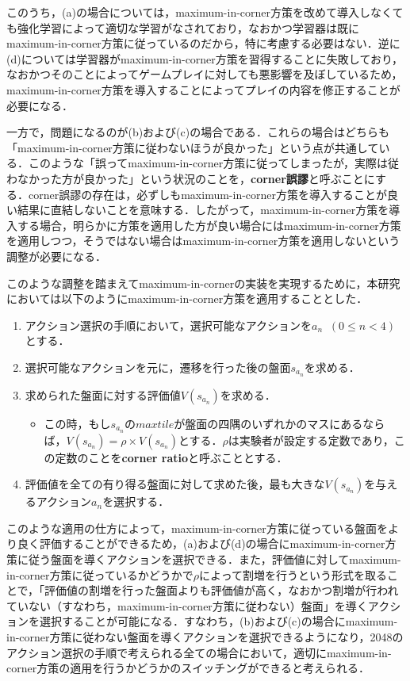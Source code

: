 \documentclass{suribt}
\begin{document}
このうち，(a)の場合については，maximum-in-corner方策を改めて導入しなくても強化学習によって適切な学習がなされており，なおかつ学習器は既にmaximum-in-corner方策に従っているのだから，特に考慮する必要はない．逆に(d)については学習器がmaximum-in-corner方策を習得することに失敗しており，なおかつそのことによってゲームプレイに対しても悪影響を及ぼしているため，maximum-in-corner方策を導入することによってプレイの内容を修正することが必要になる．

一方で，問題になるのが(b)および(c)の場合である．これらの場合はどちらも「maximum-in-corner方策に従わないほうが良かった」という点が共通している．このような「誤ってmaximum-in-corner方策に従ってしまったが，実際は従わなかった方が良かった」という状況のことを，\textbf{corner誤謬}と呼ぶことにする．corner誤謬の存在は，必ずしもmaximum-in-corner方策を導入することが良い結果に直結しないことを意味する．したがって，maximum-in-corner方策を導入する場合，明らかに方策を適用した方が良い場合にはmaximum-in-corner方策を適用しつつ，そうではない場合はmaximum-in-corner方策を適用しないという調整が必要になる．

このような調整を踏まえてmaximum-in-cornerの実装を実現するために，本研究においては以下のようにmaximum-in-corner方策を適用することとした．

\begin{enumerate}
\item アクション選択の手順において，選択可能なアクションを$a_n \;\; (0 \leq n < 4)$とする．
\item 選択可能なアクションを元に，遷移を行った後の盤面$s_{a_n}$を求める．
\item 求められた盤面に対する評価値$V(s_{a_n})$を求める．
\begin{itemize}
\item この時，もし$s_{a_n}$の$maxtile$が盤面の四隅のいずれかのマスにあるならば，$V(s_{a_n}) = {\rho} \times V(s_{a_n})$とする．${\rho}$は実験者が設定する定数であり，この定数のことを\textbf{corner ratio}と呼ぶこととする．
\end{itemize}
\item 評価値を全ての有り得る盤面に対して求めた後，最も大きな$V(s_{a_n})$を与えるアクション$a_n$を選択する．
\end{enumerate}

このような適用の仕方によって，maximum-in-corner方策に従っている盤面をより良く評価することができるため，(a)および(d)の場合にmaximum-in-corner方策に従う盤面を導くアクションを選択できる．また，評価値に対してmaximum-in-corner方策に従っているかどうかで${\rho}$によって割増を行うという形式を取ることで，「評価値の割増を行った盤面よりも評価値が高く，なおかつ割増が行われていない（すなわち，maximum-in-corner方策に従わない）盤面」を導くアクションを選択することが可能になる．すなわち，(b)および(c)の場合にmaximum-in-corner方策に従わない盤面を導くアクションを選択できるようになり，2048のアクション選択の手順で考えられる全ての場合において，適切にmaximum-in-corner方策の適用を行うかどうかのスイッチングができると考えられる．
\end{document}

